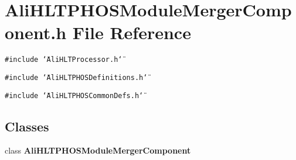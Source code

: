 \section{Ali\-HLTPHOSModule\-Merger\-Component.h File Reference}
\label{AliHLTPHOSModuleMergerComponent_8h}


{\tt \#include \char`\"{}Ali\-HLTProcessor.h\char`\"{}}\par
{\tt \#include \char`\"{}Ali\-HLTPHOSDefinitions.h\char`\"{}}\par
{\tt \#include \char`\"{}Ali\-HLTPHOSCommon\-Defs.h\char`\"{}}\par
\subsection*{Classes}
\begin{CompactItemize}
\item 
class {\bf Ali\-HLTPHOSModule\-Merger\-Component}
\end{CompactItemize}
